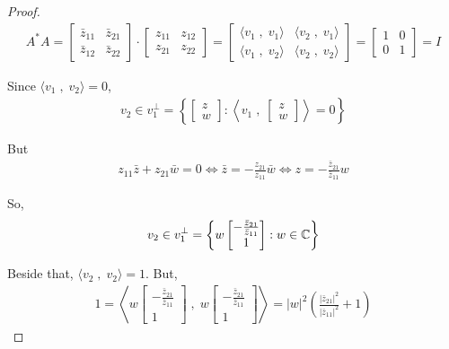 \begin{proof}
\begin{gather*}
    A^{*}A = \begin{bmatrix}
    \bar{z}_{11} & \bar{z}_{21}\\
    \bar{z}_{12} & \bar{z}_{22}
    \end{bmatrix} \cdot \begin{bmatrix}
    z_{11} & z_{12}\\
    z_{21} & z_{22}
    \end{bmatrix} = \begin{bmatrix}
    \langle v_1 \; , \; v_1 \rangle & \langle v_2 \; , \; v_1 \rangle\\
    \langle v_1 \; , \; v_2 \rangle & \langle v_2 \; , \; v_2 \rangle
    \end{bmatrix} = \begin{bmatrix}
    1 & 0\\
    0 & 1
    \end{bmatrix} = I
\end{gather*}

Since $\langle v_1 \; , \; v_2 \rangle = 0$, 
\begin{gather*}
    v_2 \in v_1^{\perp} = \left\{\begin{bmatrix}
    z\\
    w
    \end{bmatrix} : \left\langle v_1 \; , \; \begin{bmatrix}
    z\\
    w
    \end{bmatrix} \right\rangle = 0 \right\}
\end{gather*}

But
\begin{align*}
    z_{11}\bar{z}+z_{21}\bar{w}=0 \Leftrightarrow \bar{z}=-\frac{z_{21}}{z_{11}}\bar{w} \Leftrightarrow z=-\frac{\bar{z}_{21}}{\bar{z}_{11}}w
\end{align*}

So, 
\begin{gather*}
    v_2 \in v_1^{\perp} = \left\{ w\begin{bmatrix}
    -\frac{\bar{z}_{21}}{\bar{z}_{11}}\\
    1
    \end{bmatrix} : w \in \mathbb{C} \right\}
\end{gather*}


Beside that, $\langle v_2 \; , \; v_2 \rangle = 1$.
But,
\begin{gather*}
    1 = \left\langle w\begin{bmatrix}
    -\frac{\bar{z}_{21}}{\bar{z}_{11}}\\
    1
    \end{bmatrix} \; , \; w\begin{bmatrix}
    -\frac{\bar{z}_{21}}{\bar{z}_{11}}\\
    1
    \end{bmatrix} \right\rangle = |w|^2 \left(\frac{|\bar{z}_{21}|^2}{|\bar{z}_{11}|^2}+1\right)
\end{gather*}


\end{proof}
